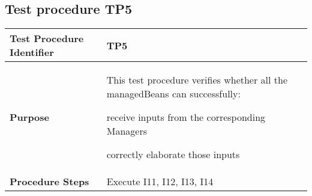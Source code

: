 \subsection{Test procedure TP5}

\begin{table}[!htbp]
\begin{center}
\begin{tabular}[t]{p{}|p{}}

\hline
\textbf{Test Procedure Identifier} & TP5 \\
\hline
\textbf{Purpose} & This test procedure verifies whether all the managedBeans can successfully:
\begin{itemize*}
	\item receive inputs from the corresponding Managers 
	\item correctly elaborate those inputs
\end{itemize*} \\
\hline
\textbf{Procedure Steps} & Execute I11, I12, I13, I14 \\
\hline

\end{tabular}
\end{center}
\end{table}
\clearpage
